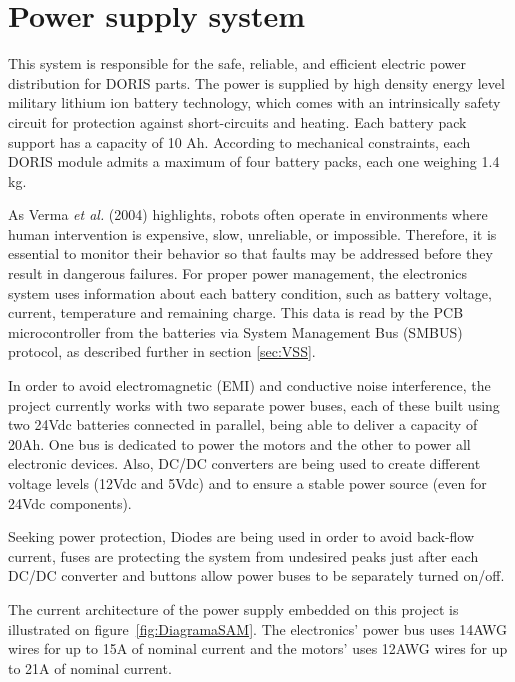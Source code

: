 \documentclass{ifacconf}
\begin{document}
\section{Power supply system}\label{sec:powersupply_overview}
This system is responsible for the safe, reliable, and efficient electric power distribution for DORIS parts. The power is supplied by high
density energy level military lithium ion battery technology, which comes with
an intrinsically safety circuit for protection against short-circuits and heating. Each battery pack support has a capacity of 10 Ah. According to mechanical constraints, each DORIS module admits a maximum of four battery packs, each one weighing 1.4 kg.

As Verma \emph{et al.} (2004) highlights, robots often operate in environments
where human intervention is expensive, slow, unreliable, or impossible. Therefore, it is essential to monitor their behavior so that faults may be addressed before they result in dangerous failures. For proper power management, the electronics system uses information about each battery condition, such as battery voltage, current, temperature and remaining charge. This data is read by the PCB microcontroller from the batteries via System Management Bus (SMBUS) protocol, as described further in section \ref{sec:VSS}.

In order to avoid electromagnetic (EMI) and conductive noise interference, the project
currently works with two separate power buses, each of these built using two
24Vdc batteries connected in parallel, being able to deliver a capacity of
20Ah. One bus is dedicated to power the motors and the other to power all
electronic devices. Also, DC/DC converters are
being used to create different voltage levels (12Vdc and 5Vdc) and to
ensure a stable power source (even for 24Vdc components).

Seeking power protection, Diodes are being used in order to avoid back-flow
current, fuses are protecting the system from undesired peaks just after each
DC/DC converter and buttons allow power buses to be separately turned on/off.


The current architecture of the power supply embedded on this project is
illustrated on figure~\ref{fig:DiagramaSAM}. The electronics' power bus uses
14AWG wires for up to 15A of nominal current and the motors' uses
12AWG wires for up to 21A of nominal current.
\end{document}
